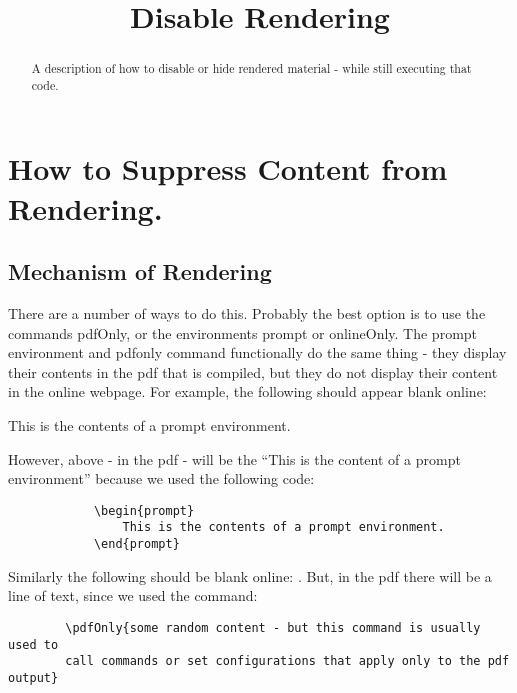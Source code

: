 \documentclass{ximera}
\title{Disable Rendering}
\begin{document}
\begin{abstract}
    A description of how to disable or hide rendered material - while still executing that code.
\end{abstract}
\maketitle
   
\section*{How to Suppress Content from Rendering.}
    \subsection*{Mechanism of Rendering}
        
        There are a number of ways to do this. Probably the best option is to use the commands pdfOnly, or the environments prompt or onlineOnly. The prompt environment and pdfonly command functionally do the same thing - they display their contents in the pdf that is compiled, but they do not display their content in the online webpage. For example, the following should appear blank online:
        
        \begin{prompt}
            This is the contents of a prompt environment.
        \end{prompt}
        
        However, above - in the pdf - will be the ``This is the content of a prompt environment'' because we used the following code:
        
        \begin{verbatim}
            \begin{prompt}
                This is the contents of a prompt environment.
            \end{prompt}
        \end{verbatim}

        Similarly the following should be blank online: . But, in the pdf there will be a line of text, since we used the command:\\
        
        \begin{verbatim}
        \pdfOnly{some random content - but this command is usually used to 
        call commands or set configurations that apply only to the pdf output}
        \end{verbatim}
        
\end{document}
